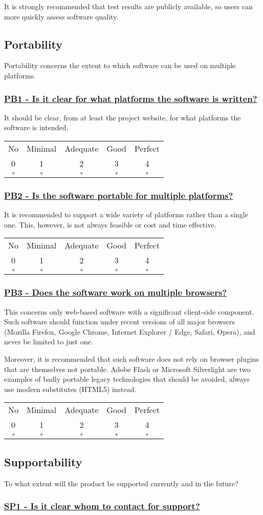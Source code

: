 \documentclass[a4paper,11pt]{article}
\newcommand{\criterion}[2]{\subsubsection*{\underline{#1 - #2}}\label{id:#1}}
\newcommand\CheckTable{%
  \begin{tabular}{ccccc}
    No & Minimal & Adequate & Good & Perfect \\
    0 & 1 & 2 & 3 & 4 \\
    \hline
    $\square$ & $\square$ & $\square$ & $\square$ & $\square$ \\
  \end{tabular}%
}
\begin{document}
It is strongly recommended that test results are publicly available, so users
can more quickly assess software quality.

\subsection{Portability}\label{sec:por}

Portability concerns the extent to which software can be used on multiple
platforms. 

\newcommand{\pbOneID}{PB1}
\newcommand{\pbOneText}{Is it clear for what platforms the software is written?}
\criterion{\pbOneID}{\pbOneText}

It should be clear, from at least the project website, for what platforms the software
is intended.

\CheckTable

\newcommand{\pbTwoID}{PB2}
\newcommand{\pbTwoText}{Is the software portable for multiple platforms?}
\criterion{\pbTwoID}{\pbTwoText}

It is recommended to support a wide variety of platforms rather than a single
one. This, however, is not always feasible or cost and time effective.

\CheckTable

\newcommand{\pbThreeID}{PB3}
\newcommand{\pbThreeText}{Does the software work on multiple browsers?}
\criterion{\pbThreeID}{\pbThreeText}

This concerns only web-based software with a significant client-side component.
Such software should function under recent versions of all major browsers
(Mozilla Firefox, Google Chrome, Internet Explorer / Edge, Safari, Opera), and
never be limited to just one.

Moreover, it is recommended that such software does not rely on browser plugins that
are themselves not portable. Adobe Flash or Microsoft Silverlight are two
examples of badly portable legacy technologies that should be avoided, always use
modern substitutes (HTML5) instead.

\CheckTable

\subsection{Supportability}\label{sec:sup}

To what extent will the product be supported currently and in the future?

\newcommand{\spOneID}{SP1}
\newcommand{\spOneText}{Is it clear whom to contact for support?}
\criterion{\spOneID}{\spOneText}
\end{document}
